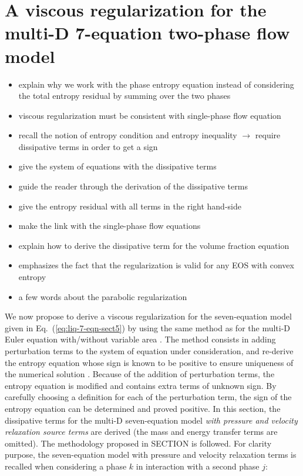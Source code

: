 \documentclass[preprint,10pt]{elsarticle}
\newcommand{\eqt}[1]{Eq.~(\ref{#1})}                     %
\begin{document}
\section{A viscous regularization for the multi-D 7-equation two-phase flow model}\label{sec:visc-regu}
\begin{itemize}
\item explain why we work with the phase entropy equation instead of considering the total entropy residual by summing over the two phases
\item viscous regularization must be consistent with single-phase flow equation
\item recall the notion of entropy condition and entropy inequality $\to$ require dissipative terms in order to get a sign
\item give the system of equations with the dissipative terms
\item guide the reader through the derivation of the dissipative terms
\item give the entropy residual with all terms in the right hand-side
\item make the link with the single-phase flow equations
\item explain how to derive the dissipative term for the volume fraction equation
\item emphasizes the fact that the regularization is valid for any EOS with convex entropy
\item a few words about the parabolic regularization
\end{itemize}
%
We now propose to derive a viscous regularization for the seven-equation model given in \eqt{eq:liq-7-eqn-sect5} by using the same method as for the multi-D Euler equation with/without variable area \cite{jlg, Marco_dissertation}. The method consists in adding perturbation terms to the system of equation under consideration, and re-derive the entropy equation whose sign is known to be positive to ensure uniqueness of the numerical solution \cite{Leveque}. Because of the addition of perturbation terms, the entropy equation is modified and contains extra terms of unknown sign. By carefully choosing a definition for each of the perturbation term, the sign of the entropy equation can be determined and proved positive. 
%
In this section, the dissipative terms for the multi-D seven-equation model \emph{with pressure and velocity relaxation source terms} are derived (the mass and energy transfer terms are omitted). The methodology proposed in  SECTION is followed. For clarity purpose, the seven-equation model with pressure and velocity relaxation terms is recalled when considering a phase $k$ in interaction with a second phase $j$:
\end{document}
